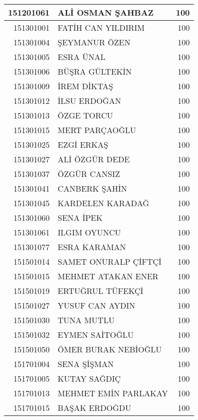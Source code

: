 \documentclass[12pt]{article}
\begin{document}
\begin{longtable}{||r||l||r||}
    \midrule
    151201061 & ALİ OSMAN ŞAHBAZ & 100 \\
    \midrule
    151301001 & FATİH CAN YILDIRIM & 100 \\
    \midrule
    151301004 & ŞEYMANUR ÖZEN & 100 \\
    \midrule
    151301005 & ESRA ÜNAL & 100 \\
    \midrule
    151301006 & BÜŞRA GÜLTEKİN & 100 \\
    \midrule
    151301009 & İREM DİKTAŞ & 100 \\
    \midrule
    151301012 & İLSU ERDOĞAN & 100 \\
    \midrule
    151301013 & ÖZGE TORCU & 100 \\
    \midrule
    151301015 & MERT PARÇAOĞLU & 100 \\
    \midrule
    151301025 & EZGİ ERKAŞ & 100 \\
    \midrule
    151301027 & ALİ ÖZGÜR DEDE & 100 \\
    \midrule
    151301037 & ÖZGÜR CANSIZ & 100 \\
    \midrule
    151301041 & CANBERK ŞAHİN & 100 \\
    \midrule
    151301045 & KARDELEN KARADAĞ & 100 \\
    \midrule
    151301060 & SENA İPEK & 100 \\
    \midrule
    151301061 & ILGIM OYUNCU & 100 \\
    \midrule
    151301077 & ESRA KARAMAN & 100 \\
    \midrule
    151501014 & SAMET ONURALP ÇİFTÇİ & 100 \\
    \midrule
    151501015 & MEHMET ATAKAN ENER & 100 \\
    \midrule
    151501019 & ERTUĞRUL TÜFEKÇİ & 100 \\
    \midrule
    151501027 & YUSUF CAN AYDIN & 100 \\
    \midrule
    151501030 & TUNA MUTLU & 100 \\
    \midrule
    151501032 & EYMEN SAİTOĞLU & 100 \\
    \midrule
    151501050 & ÖMER BURAK NEBİOĞLU & 100 \\
    \midrule
    151701004 & SENA ŞİŞMAN & 100 \\
    \midrule
    151701005 & KUTAY SAĞDIÇ & 100 \\
    \midrule
    151701013 & MEHMET EMİN PARLAKAY & 100 \\
    \midrule
    151701015 & BAŞAK ERDOĞDU & 100 \\
    \midrule

\end{longtable}
\end{document}
